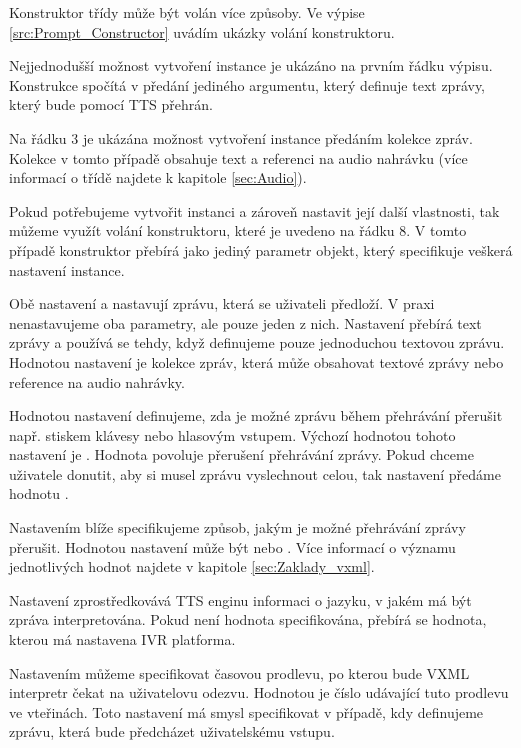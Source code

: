 \documentclass[ing,male,java,dept460]{diploma}						%
\begin{document}
Konstruktor třídy může být volán více způsoby. Ve výpise \ref{src:Prompt_Constructor} uvádím ukázky volání konstruktoru.



Nejjednodušší možnost vytvoření instance je ukázáno na prvním řádku výpisu. Konstrukce spočítá v předání jediného argumentu, který definuje text zprávy, který bude pomocí TTS přehrán.

Na řádku 3 je ukázána možnost vytvoření instance předáním kolekce zpráv. Kolekce v tomto případě obsahuje text a referenci na audio nahrávku (více informací o třídě  najdete k kapitole \ref{sec:Audio}).

Pokud potřebujeme vytvořit instanci a zároveň nastavit její další vlastnosti, tak můžeme využít volání konstruktoru, které je uvedeno na řádku 8. V tomto případě konstruktor přebírá jako jediný parametr objekt, který specifikuje veškerá nastavení instance.

Obě nastavení  a  nastavují zprávu, která se uživateli předloží. V praxi nenastavujeme oba parametry, ale pouze jeden z nich. Nastavení  přebírá text zprávy a používá se tehdy, když definujeme pouze jednoduchou textovou zprávu. Hodnotou nastavení  je kolekce zpráv, která může obsahovat textové zprávy nebo reference na audio nahrávky.

Hodnotou nastavení  definujeme, zda je možné zprávu během přehrávání přerušit např. stiskem klávesy nebo hlasovým vstupem. Výchozí hodnotou tohoto nastavení je . Hodnota  povoluje přerušení přehrávání zprávy. Pokud chceme uživatele donutit, aby si musel zprávu vyslechnout celou, tak nastavení předáme hodnotu .

Nastavením  blíže specifikujeme způsob, jakým je možné přehrávání zprávy přerušit. Hodnotou nastavení může být  nebo . Více informací o významu jednotlivých hodnot najdete v kapitole \ref{sec:Zaklady_vxml}.

Nastavení  zprostředkovává TTS enginu informaci o jazyku, v jakém má být zpráva interpretována. Pokud není hodnota specifikována, přebírá se hodnota, kterou má nastavena IVR platforma.

Nastavením  můžeme specifikovat časovou prodlevu, po kterou bude VXML interpretr čekat na uživatelovu odezvu. Hodnotou je číslo udávající tuto prodlevu ve vteřinách. Toto nastavení má smysl specifikovat v případě, kdy definujeme zprávu, která bude předcházet uživatelskému vstupu.
\end{document}
